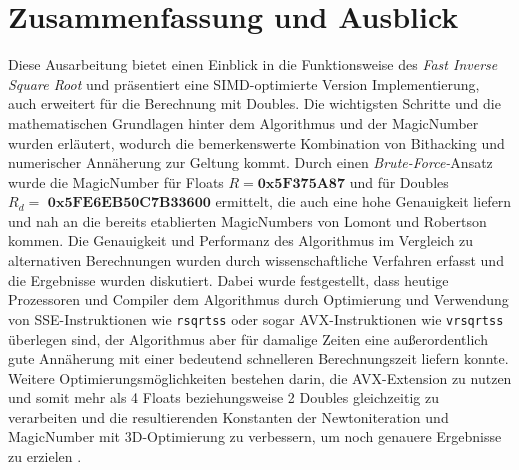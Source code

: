 \documentclass[course=erap]{aspdoc}
\begin{document}
\section{Zusammenfassung und Ausblick}
Diese Ausarbeitung bietet einen Einblick in die Funktionsweise des \emph{Fast Inverse Square Root} und präsentiert eine SIMD-optimierte Version Implementierung, auch erweitert für die Berechnung mit Doubles. Die wichtigsten Schritte und die mathematischen Grundlagen hinter dem Algorithmus und der MagicNumber wurden erläutert, wodurch die bemerkenswerte Kombination von Bithacking und numerischer Annäherung zur Geltung kommt. Durch einen \emph{Brute-Force-}Ansatz wurde die MagicNumber für Floats \boldmath $R = \textbf{0x5F375A87}$ \unboldmath und für Doubles \boldmath$R_d = \textbf{ 0x5FE6EB50C7B33600}$ \unboldmath ermittelt, die auch eine hohe Genauigkeit liefern und nah an die bereits etablierten MagicNumbers von Lomont und Robertson kommen. Die Genauigkeit und Performanz des Algorithmus im Vergleich zu alternativen Berechnungen wurden durch wissenschaftliche Verfahren erfasst und die Ergebnisse wurden diskutiert. Dabei wurde festgestellt, dass heutige Prozessoren und Compiler dem Algorithmus durch Optimierung und Verwendung von SSE-Instruktionen wie \lstinline{rsqrtss} oder sogar AVX-Instruktionen wie \lstinline{vrsqrtss} überlegen sind, der Algorithmus aber für damalige Zeiten eine außerordentlich gute Annäherung mit einer bedeutend schnelleren Berechnungszeit liefern konnte. Weitere Optimierungsmöglichkeiten bestehen darin, die AVX-Extension zu nutzen und somit mehr als 4 Floats beziehungsweise 2 Doubles gleichzeitig zu verarbeiten und die resultierenden Konstanten der Newtoniteration und MagicNumber mit 3D-Optimierung zu verbessern, um noch genauere Ergebnisse zu erzielen \cite{kadlec}.
\newpage

{}
\end{document}
